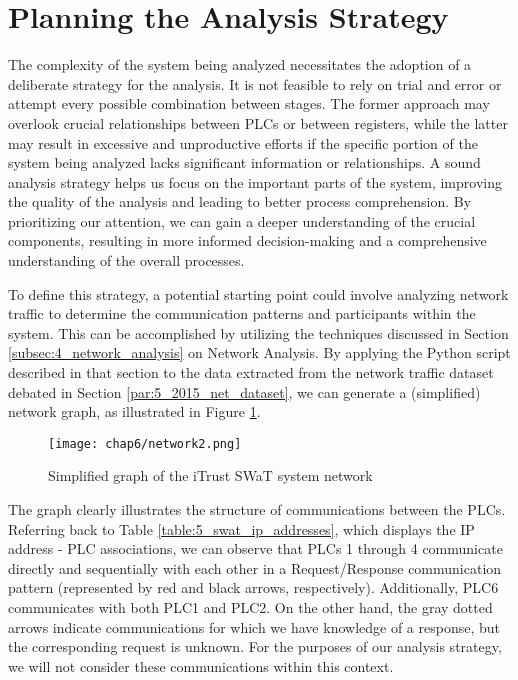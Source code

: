 \section{Planning the Analysis Strategy}
\label{sec:6_analysis_strategy}
The complexity of the system being analyzed necessitates the adoption of a deliberate strategy for the analysis. It is not feasible to rely on trial and error or attempt every possible combination between stages. The former approach may overlook crucial relationships between PLCs or between registers, while the latter may result in excessive and unproductive efforts if the specific portion of the system being analyzed lacks significant information or relationships. \newline
A sound analysis strategy helps us focus on the important parts of the system, improving the quality of the analysis and leading to better process comprehension. By prioritizing our attention, we can gain a deeper understanding of the crucial components, resulting in more informed decision-making and a comprehensive understanding of the overall processes.

\bigskip
To define this strategy, a potential starting point could involve analyzing network traffic to determine the communication patterns and participants within the system. This can be accomplished by utilizing the techniques discussed in Section \ref{subsec:4_network_analysis} on Network Analysis. By applying the Python script described in that section to the data extracted from the network traffic dataset debated in Section \ref{par:5_2015_net_dataset}, we can generate a (simplified) network graph, as illustrated in Figure \ref{fig:6_network_SWaT}.

\begin{figure}[ht]
	\centering
	\texttt{[image: chap6/network2.png]}
	\caption{Simplified graph of the iTrust SWaT system network}
	\label{fig:6_network_SWaT}
\end{figure}

The graph clearly illustrates the structure of communications between the PLCs. Referring back to Table \ref{table:5_swat_ip_addresses}, which displays the IP address - PLC associations, we can observe that PLCs 1 through 4 communicate directly and sequentially with each other in a Request/Response communication pattern (represented by red and black arrows, respectively). Additionally, PLC6 communicates with both PLC1 and PLC2. On the other hand, the gray dotted arrows indicate communications for which we have knowledge of a response, but the corresponding request is unknown. For the purposes of our analysis strategy, we will not consider these communications within this context.

